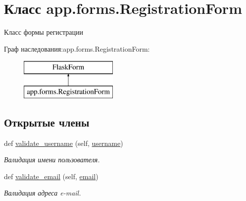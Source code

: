 \hypertarget{classapp_1_1forms_1_1_registration_form}{}\section{Класс app.\+forms.\+Registration\+Form}
\label{classapp_1_1forms_1_1_registration_form}


Класс формы регистрации  


Граф наследования\+:app.\+forms.\+Registration\+Form\+:\begin{figure}[H]
\begin{center}
\leavevmode
\includegraphics[height=2.000000cm]{classapp_1_1forms_1_1_registration_form}
\end{center}
\end{figure}
\subsection*{Открытые члены}
\begin{DoxyCompactItemize}
\item 
def \mbox{\hyperlink{classapp_1_1forms_1_1_registration_form_a69ecc2875e684131ba0eeb9451e9c47c}{validate\+\_\+username}} (self, \mbox{\hyperlink{classapp_1_1forms_1_1_registration_form_ac4f31c06a04cfadf0ecf269bcb65c29b}{username}})
\begin{DoxyCompactList}\small\item\em Валидация имени пользователя. \end{DoxyCompactList}\item 
def \mbox{\hyperlink{classapp_1_1forms_1_1_registration_form_a03ad81c1e7ea6eaad93fb503be3f6f4b}{validate\+\_\+email}} (self, \mbox{\hyperlink{classapp_1_1forms_1_1_registration_form_af98d363c036c4b9afcf8ac4bc2d3ee6a}{email}})
\begin{DoxyCompactList}\small\item\em Валидация адреса e-\/mail. \end{DoxyCompactList}\end{DoxyCompactItemize}
